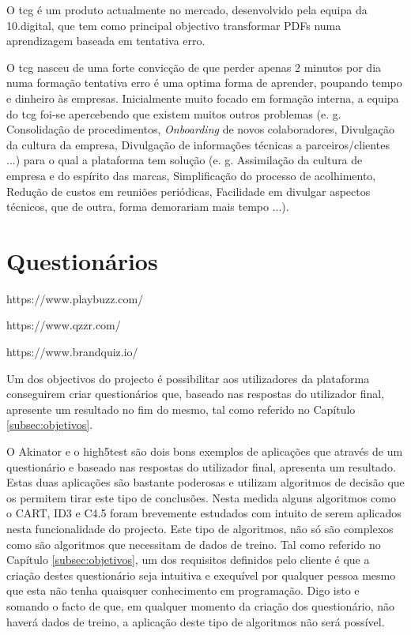 O \acrlong{tcg} é um produto actualmente no mercado, desenvolvido pela equipa da 10.digital, que tem como principal objectivo transformar PDFs numa aprendizagem baseada em tentativa erro.

 O \acrshort{tcg} nasceu de uma forte convicção de que perder apenas 2 minutos por dia numa formação tentativa erro é uma optima forma de aprender, poupando tempo e dinheiro às empresas. Inicialmente muito focado em formação interna, a equipa do \acrshort{tcg} foi-se apercebendo que existem muitos outros problemas (e. g. Consolidação de procedimentos, \textit{Onboarding} de novos colaboradores, Divulgação da cultura da empresa, Divulgação de informações técnicas a parceiros/clientes ...) para o qual a plataforma tem solução (e. g. Assimilação da cultura de empresa e do espírito das marcas, Simplificação do processo de acolhimento, Redução de custos em reuniões periódicas, Facilidade em divulgar aspectos técnicos, que de outra, forma demorariam mais tempo ...).\cite{tcginfo}



\section{Questionários}
\label{questionarios}

https://www.playbuzz.com/

https://www.qzzr.com/

https://www.brandquiz.io/



Um dos objectivos do projecto é possibilitar aos utilizadores da plataforma conseguirem criar questionários que, baseado nas respostas do utilizador final, apresente um resultado no fim do mesmo, tal como referido no Capítulo \ref{subsec:objetivos}.

O Akinator\cite{akinator} e o high5test\cite{5} são dois bons exemplos de aplicações que através de um questionário e baseado nas respostas do utilizador final, apresenta um resultado. Estas duas aplicações são bastante poderosas e utilizam algoritmos de decisão que os permitem tirar este tipo de conclusões. Nesta medida alguns algoritmos como o CART\cite{cart}, ID3\cite{id3}\cite{id3_2}\cite{cart} e C4.5\cite{cart}\cite{c4.5} foram brevemente estudados com intuito de serem aplicados nesta funcionalidade do projecto. Este tipo de algoritmos, não só são complexos como são algoritmos que necessitam de dados de treino. Tal como referido no Capítulo \ref{subsec:objetivos}, um dos requisitos definidos pelo cliente é que a criação destes questionário seja intuitiva e exequível por qualquer pessoa mesmo que esta não tenha quaisquer conhecimento em programação. Digo isto e somando o facto de que, em qualquer momento da criação dos questionário, não haverá dados de treino, a aplicação deste tipo de algoritmos não será possível.

